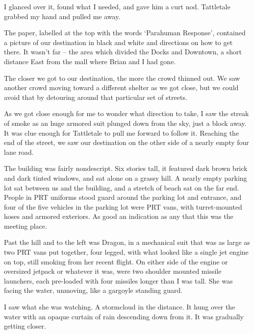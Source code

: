 I glanced over it, found what I needed, and gave him a curt nod.  Tattletale grabbed my hand and pulled me away.



The paper, labelled at the top with the words `Parahuman Response', contained a picture of our destination in black and white and directions on how to get there.  It wasn't far – the area which divided the Docks and Downtown, a short distance East from the mall where Brian and I had gone.



The closer we got to our destination, the more the crowd thinned out.  We saw another crowd moving toward a different shelter as we got close, but we could avoid that by detouring around that particular set of streets.



As we got close enough for me to wonder what direction to take, I saw the streak of smoke as an huge armored suit plunged down from the sky, just a block away.  It was clue enough for Tattletale to pull me forward to follow it.  Reaching the end of the street, we saw our destination on the other side of a nearly empty four lane road.



The building was fairly nondescript.  Six stories tall, it featured dark brown brick and dark tinted windows, and sat alone on a grassy hill.  A nearly empty parking lot sat between us and the building, and a stretch of beach sat on the far end.  People in PRT uniforms stood guard around the parking lot and entrance, and four of the five vehicles in the parking lot were PRT vans, with turret-mounted hoses and armored exteriors.  As good an indication as any that this was the meeting place.



Past the hill and to the left was Dragon, in a mechanical suit that was as large as two PRT vans put together, four legged, with what looked like a single jet engine on top, still smoking from her recent flight.  On either side of the engine or oversized jetpack or whatever it was, were two shoulder mounted missile launchers, each pre-loaded with four missiles longer than I was tall.  She was facing the water, unmoving, like a gargoyle standing guard.



I saw what she was watching.  A stormcloud in the distance.  It hung over the water with an opaque curtain of rain descending down from it.  It was gradually getting closer.



